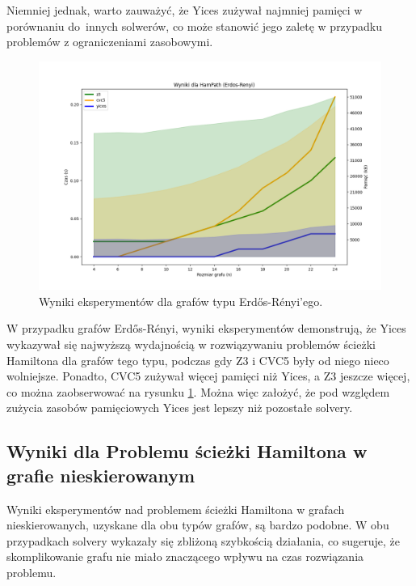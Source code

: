 Niemniej jednak, warto zauważyć, że Yices zużywał najmniej pamięci w porównaniu do~innych solwerów, co może stanowić jego zaletę w przypadku problemów z ograniczeniami zasobowymi.

\begin{figure}[htbp]
	\centering
	\begin{minipage}{\textwidth}
		\includegraphics[width=\textwidth]{./figures/1-erdos-renyi-plot.png}
		\caption{Wyniki eksperymentów dla grafów typu  Erdős-Rényi'ego.}
		\label{fig:1-erdos-renyi-plot}
	\end{minipage}
\end{figure}

W przypadku grafów Erdős-Rényi, wyniki eksperymentów demonstrują, że Yices wykazywał się najwyższą wydajnością w rozwiązywaniu problemów ścieżki Hamiltona dla grafów tego typu, podczas gdy Z3 i CVC5 były od niego nieco wolniejsze. Ponadto, CVC5 zużywał więcej pamięci niż Yices, a Z3 jeszcze więcej, co można zaobserwować na rysunku \ref{fig:1-erdos-renyi-plot}. Można więc założyć, że pod względem zużycia zasobów pamięciowych Yices jest lepszy niż pozostałe solvery.

\subsection{Wyniki dla Problemu ścieżki Hamiltona w grafie nieskierowanym}

Wyniki eksperymentów nad problemem ścieżki Hamiltona w grafach nieskierowanych, uzyskane dla obu typów grafów, są bardzo podobne. W obu przypadkach solvery wykazały się zbliżoną szybkością działania, co sugeruje, że skomplikowanie grafu nie miało znaczącego wpływu na czas rozwiązania problemu.

